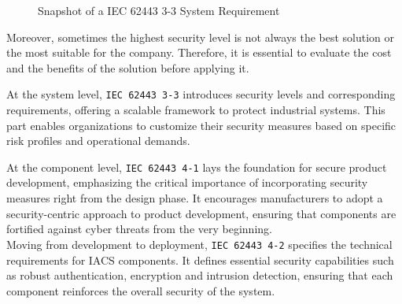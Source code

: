 \begin{figure}[ht]
  \centering
  \caption[Snapshot of a IEC 62443 3-3 System Requirement]{Snapshot of a IEC 62443 3-3 System Requirement}
  \label{fig:iec62443_3-3_3_9}
\end{figure}

Moreover, sometimes the highest security level is not always the best solution or the most suitable for the company. Therefore, it is essential to evaluate the cost and the benefits of the solution before applying it.

At the system level, \texttt{IEC 62443 3-3} introduces security levels and corresponding requirements, offering a scalable framework to protect industrial systems. This part enables organizations to customize their security measures based on specific risk profiles and operational demands.

At the component level, \texttt{IEC 62443 4-1} lays the foundation for secure product development, emphasizing the critical importance of incorporating security measures right from the design phase. It encourages manufacturers to adopt a security-centric approach to product development, ensuring that components are fortified against cyber threats from the very beginning.\\
Moving from development to deployment, \texttt{IEC 62443 4-2} specifies the technical requirements for IACS components. It defines essential security capabilities such as robust authentication, encryption and intrusion detection, ensuring that each component reinforces the overall security of the system.~\cite{iec-62443-safeguarding-industrial-automation-linkedin}


